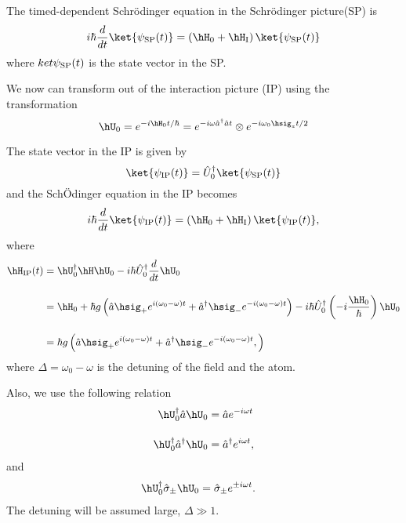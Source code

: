 The timed-dependent Schr\"{o}dinger equation in the Schr\"{o}dinger picture(SP) is
\begin{equation}
    i\hbar\frac{d}{dt}\ket{\psi_{\rm{SP}}(t)}
    =\left(
    \hH_0+\hH_{\rm{I}}
    \right)
    \ket{\psi_{\rm{SP}}(t)}
\end{equation}
where $ket{\psi_{\rm{SP}}(t)}$ is the state vector in the SP.

We now can transform out of the interaction picture (IP) using the transformation
\begin{equation}
    \hU_0=e^{-i\hH_0 t/\hbar}
    =e^{-i\omega\hat{a}^{\dagger}\hat{a} t}\otimes
    e^{-i\omega_0\hsig_z t/2}
\end{equation}

The state vector in the IP is given by
\begin{equation}
    \ket{\psi_{\rm{IP}}(t)}
    =\hat{U}_0^\dagger\ket{\psi_{\rm{SP}}(t)}
\end{equation}
and the Sch\"{O}dinger equation in the IP becomes
\begin{equation}
    i\hbar\frac{d}{dt}\ket{\psi_{\rm{IP}}(t)}
    =\left(
    \hH_0+\hH_{\rm{I}}
    \right)
    \ket{\psi_{\rm{IP}}(t)},
\end{equation}
where
\begin{align}
    \hH_{\rm{IP}}(t)
    &=\hU_0^\dagger\hH\hU_0
    -i\hbar\hat{U}_0^\dagger\frac{d}{dt}\hU_0\\[10pt]
    &=\hH_0 + \hbar g \left(
    \hat{a}\hsig_+e^{i(\omega_0-\omega)t}
    +\hat{a}^\dagger\hsig_-e^{-i(\omega_0-\omega)t}
    \right)
    -i\hbar\hat{U}_0^\dagger\left(
    -i\frac{\hH_0}{\hbar}
    \right)\hU_0\\[10pt]
    &=\hbar g \left(
    \hat{a}\hsig_+e^{i(\omega_0-\omega)t}
    +\hat{a}^\dagger\hsig_-e^{-i(\omega_0-\omega)t},
    \right)
\end{align}
where $\Delta=\omega_0-\omega$ is the detuning of the field and the atom.

Also, we use the following relation
\begin{align}
    \hU^{\dagger}_0\hat{a}\hU_0&=\hat{a}e^{-i\omega t}\\[10pt]
    \hU^{\dagger}_0\hat{a}^{\dagger}\hU_0&=\hat{a}^{\dagger}e^{i\omega t},
\end{align}
and 
\begin{align}
    \hU^{\dagger}_0\hat{\sigma}_{\pm}\hU_0&=\hat{\sigma}_{\pm}e^{\pm i\omega t}.
\end{align}
The detuning will be assumed large, $\Delta \gg 1$.

